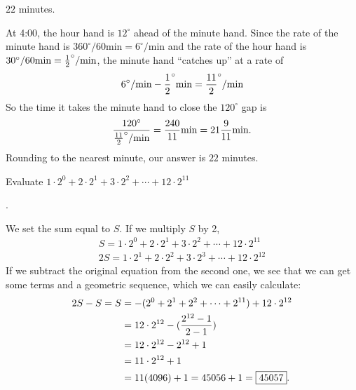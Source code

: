 \documentclass[11pt]{article}
\DeclareRobustCommand{\frac}[3][0pt]{%
  {\begingroup\hspace{#1}#2\hspace{#1}\endgroup\over\hspace{#1}#3\hspace{#1}}}
\begin{document}
\begin{answer}
$\boxed{22}$ minutes.
\end{answer}
\begin{solution}
At 4:00, the hour hand is $12^{\circ}$ ahead of the minute hand. Since the rate of the minute hand is $360^{\circ} / 60 \text{min} = 6 ^{\circ} / \text{min}$ and the rate of the hour hand is $30 ^{\circ} / 60 \text{min}= \frac{1}{2} ^{\circ} / \text{min}$, the minute hand ``catches up'' at a rate of
$$6 ^{\circ} / \text{min}-\frac{1}{2} ^{\circ} \text{min} = \frac{11}{2} ^{\circ} / \text{min}$$
So the time it takes the minute hand to close the $120 ^{\circ}$ gap is
$$\frac{120 ^{\circ}}{\frac{11}{2} ^{\circ} / \text{min}} = \frac{240}{11} \text{min} = 21 \frac{9}{11} \text{min}.$$
Rounding to the nearest minute, our answer is $\boxed{22}$ minutes.
\end{solution}

\begin{problem}Evaluate $1\cdot2^{0} + 2\cdot2^1 + 3\cdot2^2 +\cdots+12\cdot2^{11}$
\end{problem}

\begin{answer}
.
\end{answer}
\begin{solution}
We set the sum equal to $S$. If we multiply $S$ by 2,
\begin{align*}
S = 1\cdot2^{0} + 2\cdot2^1 + 3\cdot2^2 +\cdots+12\cdot2^{11} \\
2S = 1\cdot2^{1} + 2\cdot2^2 + 3\cdot2^3 +\cdots+12\cdot2^{12}
\end{align*}
If we subtract the original equation from the second one, we see that we can get some terms and a geometric sequence, which we can easily calculate:
\begin{align*}
2S-S=S &= -(2^0 + 2^1+2^2+\cdots+2^{11})+12 \cdot 2^{12} \\
&= 12\cdot 2^{12}- (\frac{2^{12}-1}{2-1}) \\
&= 12\cdot 2^{12}-2^{12}+1 \\
&= 11 \cdot 2^{12} + 1 \\
&= 11(4096) + 1 = 45056+1 = \boxed{45057}.
\end{align*}
\end{solution}
\end{document}
